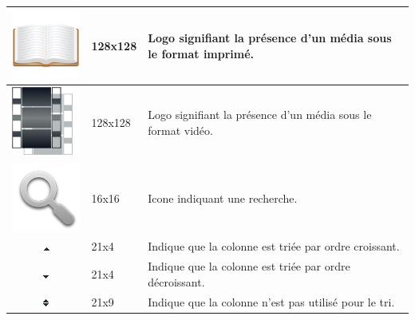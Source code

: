 \documentclass[letter, 11pt]{report}
\begin{document}
\begin{table}[h!tbp]
\begin{center}
\begin{tabular}{|c|l|p{10cm}|}
		\includegraphics[scale=0.3]{imprime.png}         & 128x128          & Logo signifiant la présence d'un média sous le format imprimé. \\ \hline
		\includegraphics[scale=0.3]{video.png}           & 128x128          & Logo signifiant la présence d'un média sous le format vidéo. \\ \hline
		\includegraphics[scale=0.15]{search.png}         & 16x16            & Icone indiquant une recherche. \\ \hline
		\includegraphics{down.png}                       & 21x4             & Indique que la colonne est triée par ordre croissant. \\ \hline
		\includegraphics{up.png}                         & 21x4             & Indique que la colonne est triée par ordre décroissant. \\ \hline
		\includegraphics{upAndDown.png}                  & 21x9             & Indique que la colonne n'est pas utilisé pour le tri. \\ \hline
		\end{tabular}
	\end{center}
\end{table}
\end{document}
